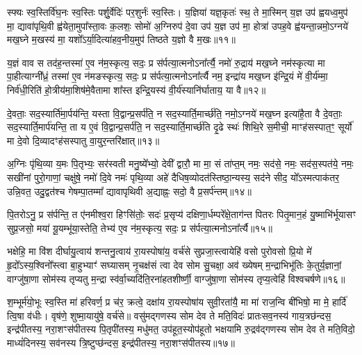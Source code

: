 स्फ्यः स्व॒स्तिर्वि॑घ॒नः स्व॒स्तिः पर्\mbox{}शु॒र्वेदिः॑ पर॒शुर्नः॑ स्व॒स्तिः। य॒ज्ञिया॑ यज्ञ॒कृतः॑ स्थ॒ ते मा॒स्मिन् य॒ज्ञ उप॑ ह्वयध्व॒मुप॑ मा॒ द्यावा॑पृथि॒वी ह्व॑येता॒मुपा᳚स्ता॒वः क॒लशः॒ सोमो॑ अ॒ग्निरुप॑ दे॒वा उप॑ य॒ज्ञ उप॑ मा॒ होत्रा॑ उपह॒वे ह्व॑यन्ता॒न्नमो॒\-ऽग्नये॑ मख॒घ्ने म॒खस्य॑ मा॒ यशो᳚\-ऽर्या॒दित्या॑हव॒नीय॒मुप॑ तिष्ठते य॒ज्ञो वै म॒खः॥११॥

य॒ज्ञं वाव स तद॑ह॒न्तस्मा॑ ए॒व न॑म॒स्कृत्य॒ सदः॒ प्र स॑र्पत्या॒त्मनो\-ऽना᳚र्त्यै॒ नमो॑ रु॒द्राय॑ मख॒घ्ने नम॑स्कृत्या मा पा॒हीत्याग्नी᳚ध्रं॒ तस्मा॑ ए॒व न॑मङस्कृत्य॒ सदः॒ प्र स॑र्पत्या॒त्मनो\-ऽना᳚र्त्यै नम॒ इन्द्रा॑य मख॒घ्न इ॑न्द्रि॒यं मे॑ वी॒र्य॑म्मा॒ निर्व॑धी॒रिति॑ हो॒त्रीय॑मा॒शिष॑मे॒वैतामा शा᳚स्त इन्द्रि॒यस्य॑ वी॒र्य॑स्यानि॑र्घाताय॒ या वै॥१२॥

दे॒वताः॒ सद॒स्यार्ति॑मा॒र्पय॑न्ति॒ यस्ता वि॒द्वान्प्र॒सर्प॑ति॒ न सद॒स्यार्ति॒मार्च्छ॑ति॒ नमो॒\-ऽग्नये॑ मख॒घ्न इत्या॑है॒ता वै दे॒वताः॒ सद॒स्यार्ति॒मार्प॑यन्ति॒ ता य ए॒वं वि॒द्वान्प्र॒सर्प॑ति॒ न सद॒स्यार्ति॒मार्च्छ॑ति दृ॒ढे स्थः॑ शिथि॒रे स॒मीची॒ माꣳह॑सस्पात॒ꣳ॒ सूर्यो॑ मा दे॒वो दि॒व्यादꣳह॑सस्पातु वा॒युर॒न्तरि॑क्षात्॥१३॥

अ॒ग्निः पृ॑थि॒व्या य॒मः पि॒तृभ्यः॒ सर॑स्वती मनु॒ष्ये᳚भ्यो॒ देवी᳚ द्वारौ॒ मा मा॒ सं ता॑प्त॒म् नमः॒ सद॑से॒ नमः॒ सद॑स॒स्पत॑ये॒ नमः॒ सखी॑नां पुरो॒गाणां॒ चक्षु॑षे॒ नमो॑ दि॒वे नमः॑ पृथि॒व्या अहे॑ दैधिष॒व्योदत॑स्तिष्ठा॒न्यस्य॒ सद॑ने सीद॒ यो᳚\-ऽस्मत्पाक॑तर॒ उन्नि॒वत॒ उदु॒द्वत॑श्च गेषम्पा॒तम्मा᳚ द्यावापृथिवी अ॒द्याह्नः॒ सदो॒ वै प्र॒सर्प॑न्तम्॥१४॥

पि॒तरो\-ऽनु॒ प्र स॑र्पन्ति॒ त ए॑नमीश्व॒रा हिꣳसि॑तोः॒ सदः॑ प्र॒सृप्य॑ दक्षिणा॒र्धम्परे᳚क्षे॒ताग॑न्त पितरः पितृ॒मान॒हं यु॒ष्माभि॑र्भूयासꣳ सुप्र॒जसो॒ मया॑ यू॒यम्भू॑या॒स्तेति॒ तेभ्य॑ ए॒व न॑म॒स्कृत्य॒ सदः॒ प्र स॑र्पत्या॒त्मनो\-ऽना᳚र्त्यै॥१५॥

{\anuvakamend[{म॒खो वा अ॒न्तरि॑क्षात्प्र॒सर्प॑न्त॒न्त्रय॑स्त्रिꣳशच्च॥४॥}]}

भक्षेहि॒ मा वि॑श दीर्घायु॒त्वाय॑ शन्तनु॒त्वाय॑ रा॒यस्पोषा॑य॒ वर्च॑से सुप्रजा॒स्त्वायेहि॑ वसो पुरोवसो प्रि॒यो मे॑ हृ॒दो᳚\-ऽस्य॒श्विनो᳚स्त्वा बा॒हुभ्याꣳ॑ सघ्यासम् नृ॒चक्ष॑सं त्वा देव सोम सु॒चक्षा॒ अव॑ ख्येषम् म॒न्द्राभिभू॑तिः के॒तुर्य॒ज्ञानां॒ वाग्जु॑षा॒णा सोम॑स्य तृप्यतु म॒न्द्रा स्व॑र्वा॒च्यदि॑ति॒रना॑हतशीर्ष्णी॒ वाग्जु॑षा॒णा सोम॑स्य तृप्य॒त्वेहि॑ विश्वचर्\mbox{}षणे॥१६॥

श॒म्भूर्म॑यो॒भूः स्व॒स्ति मा॑ हरिवर्ण॒ प्र च॑र॒ क्रत्वे॒ दक्षा॑य रा॒यस्पोषा॑य सुवी॒रता॑यै॒ मा मा॑ राज॒न्वि बी॑भिषो॒ मा मे॒ हार्दि॑ त्वि॒षा व॑धीः। वृष॑णे॒ शुष्मा॒यायु॑षे॒ वर्च॑से॥ वसु॑मद्गणस्य सोम देव ते मति॒विदः॑ प्रातःसव॒नस्य॑ गाय॒त्रछ॑न्दस॒ इन्द्र॑पीतस्य॒ नरा॒शꣳस॑पीतस्य पि॒तृपी॑तस्य॒ मधु॑मत॒ उप॑हूत॒स्योप॑हूतो भक्षयामि रु॒द्रव॑द्गणस्य सोम देव ते मति॒विदो॒ माध्यं॑दिनस्य॒ सव॑नस्य त्रि॒ष्टुप्छ॑न्दस॒ इन्द्र॑पीतस्य॒ नरा॒शꣳस॑पीतस्य॥१७॥

